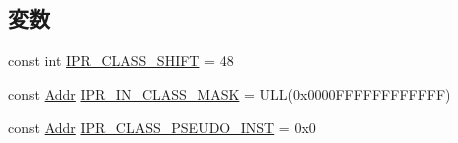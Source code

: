 \subsection*{変数}
\begin{Indent}{\bf }\par
{\em \label{_amgrpd41d8cd98f00b204e9800998ecf8427e}
 }\begin{DoxyCompactItemize}
\item 
const int \hyperlink{namespaceGenericISA_aeb17d164394fbbccc6ef6992f36e9a74}{IPR\_\-CLASS\_\-SHIFT} = 48
\item 
const \hyperlink{base_2types_8hh_af1bb03d6a4ee096394a6749f0a169232}{Addr} \hyperlink{namespaceGenericISA_ada17fbe3666ca6de3621618e5abf7791}{IPR\_\-IN\_\-CLASS\_\-MASK} = ULL(0x0000FFFFFFFFFFFF)
\item 
const \hyperlink{base_2types_8hh_af1bb03d6a4ee096394a6749f0a169232}{Addr} \hyperlink{namespaceGenericISA_a7691200ba0d3fea3d1bfdc555efb9b76}{IPR\_\-CLASS\_\-PSEUDO\_\-INST} = 0x0
\end{DoxyCompactItemize}
\end{Indent}


